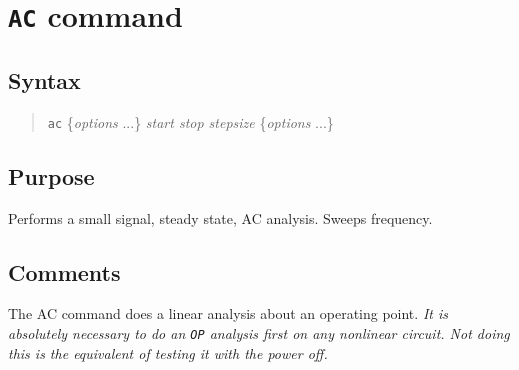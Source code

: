 %
%
%
%
\section{{\tt AC} command}
\subsection{Syntax}
\begin{verse}
{\tt ac} \{{\it options} ...\} {\it start stop stepsize} \{{\it options} ...\}
\end{verse}
\subsection{Purpose}

Performs a small signal, steady state, AC analysis.  Sweeps frequency.
\subsection{Comments}

The AC command does a linear analysis about an operating point.  {\em
It is absolutely necessary to do an {\tt OP} analysis first on any
nonlinear circuit.  Not doing this is the equivalent of testing it
with the power off.}

